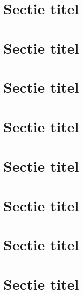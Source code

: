 \section{Sectie titel}
\section{Sectie titel}
\section{Sectie titel}
\section{Sectie titel}
\section{Sectie titel}
\section{Sectie titel}
\section{Sectie titel}
\section{Sectie titel}


